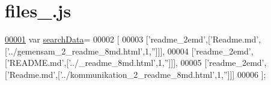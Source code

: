 \hypertarget{files__6_8js_source}{}\section{files\+\_.\+js}
\label{files__6_8js_source}

\begin{DoxyCode}
\hypertarget{files__6_8js_source.tex_l00001}{}\hyperlink{files__6_8js_ad01a7523f103d6242ef9b0451861231e}{00001} var \hyperlink{files__6_8js_ad01a7523f103d6242ef9b0451861231e}{searchData}=
00002 [
00003   [\textcolor{stringliteral}{'readme\_2emd'},[\textcolor{stringliteral}{'Readme.md'},[\textcolor{stringliteral}{'../gemensam\_2\_readme\_8md.html'},1,\textcolor{stringliteral}{''}]]],
00004   [\textcolor{stringliteral}{'readme\_2emd'},[\textcolor{stringliteral}{'README.md'},[\textcolor{stringliteral}{'../\_readme\_8md.html'},1,\textcolor{stringliteral}{''}]]],
00005   [\textcolor{stringliteral}{'readme\_2emd'},[\textcolor{stringliteral}{'Readme.md'},[\textcolor{stringliteral}{'../kommunikation\_2\_readme\_8md.html'},1,\textcolor{stringliteral}{''}]]]
00006 ];
\end{DoxyCode}
